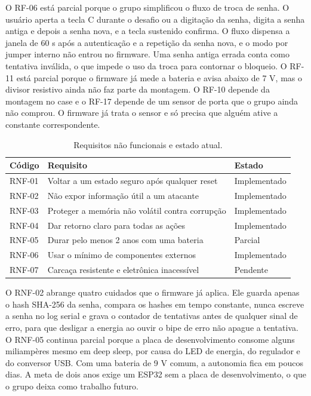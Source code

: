\documentclass[11pt,a4paper]{article}
\begin{document}
O RF-06 está parcial porque o grupo simplificou o fluxo de troca de senha. O usuário aperta a tecla C durante o desafio ou a digitação da senha, digita a senha antiga e depois a senha nova, e a tecla sustenido confirma. O fluxo dispensa a janela de 60 s após a autenticação e a repetição da senha nova, e o modo por jumper interno não entrou no firmware. Uma senha antiga errada conta como tentativa inválida, o que impede o uso da troca para contornar o bloqueio. O RF-11 está parcial porque o firmware já mede a bateria e avisa abaixo de 7 V, mas o divisor resistivo ainda não faz parte da montagem. O RF-10 depende da montagem no case e o RF-17 depende de um sensor de porta que o grupo ainda não comprou. O firmware já trata o sensor e só precisa que alguém ative a constante correspondente.

\begin{table}[H]\centering\small
\caption{Requisitos não funcionais e estado atual.}\label{tab:rnf}
\begin{tabularx}{\linewidth}{@{}l L l@{}}
\toprule
Código & Requisito & Estado \\
\midrule
RNF-01 & Voltar a um estado seguro após qualquer reset & Implementado \\
RNF-02 & Não expor informação útil a um atacante & Implementado \\
RNF-03 & Proteger a memória não volátil contra corrupção & Implementado \\
RNF-04 & Dar retorno claro para todas as ações & Implementado \\
RNF-05 & Durar pelo menos 2 anos com uma bateria & Parcial \\
RNF-06 & Usar o mínimo de componentes externos & Implementado \\
RNF-07 & Carcaça resistente e eletrônica inacessível & Pendente \\
\bottomrule
\end{tabularx}
\end{table}

O RNF-02 abrange quatro cuidados que o firmware já aplica. Ele guarda apenas o hash SHA-256 da senha, compara os hashes em tempo constante, nunca escreve a senha no log serial e grava o contador de tentativas antes de qualquer sinal de erro, para que desligar a energia ao ouvir o bipe de erro não apague a tentativa. O RNF-05 continua parcial porque a placa de desenvolvimento consome alguns miliampères mesmo em deep sleep, por causa do LED de energia, do regulador e do conversor USB. Com uma bateria de 9 V comum, a autonomia fica em poucos dias. A meta de dois anos exige um ESP32 sem a placa de desenvolvimento, o que o grupo deixa como trabalho futuro.
\end{document}
